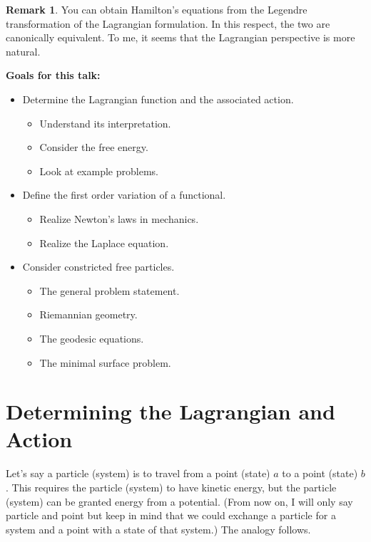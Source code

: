 \documentclass[12pt]{article}
\theoremstyle{definition}
\newtheorem{remark}{Remark}[section]
\begin{document}
\begin{remark}
You can obtain Hamilton's equations from the Legendre transformation of the Lagrangian formulation.  In this respect, the two are canonically equivalent.  To me, it seems that the Lagrangian perspective is more natural.
\end{remark}

\noindent \textbf{Goals for this talk:}
\begin{itemize}
    \item Determine the Lagrangian function and the associated action.
    \begin{itemize}
        \item Understand its interpretation.
        \item Consider the free energy.
        \item Look at example problems.
    \end{itemize}
    \item Define the first order variation of a functional.
    \begin{itemize}
        \item Realize Newton's laws in mechanics.
        \item Realize the Laplace equation.
    \end{itemize}
    \item Consider constricted free particles.
    \begin{itemize}
        \item The general problem statement.
        \item Riemannian geometry.
        \item The geodesic equations.
        \item The minimal surface problem.
    \end{itemize}
\end{itemize}

\section{Determining the Lagrangian and Action}

Let's say a particle (system) is to travel from a point (state) $a$ to a point (state) $b$.  This requires the particle (system) to have kinetic energy, but the particle (system) can be granted energy from a potential. (From now on, I will only say particle and point but keep in mind that we could exchange a particle for a system and a point with a state of that system.)  The analogy follows.
\end{document}
